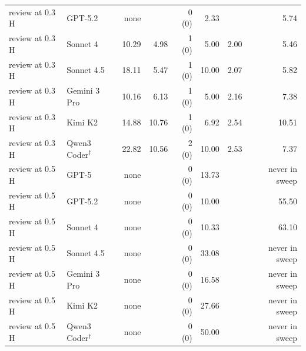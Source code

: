 \begin{table}[t]
\begin{tabular}{llrrrrrr}
review at 0.3 H & GPT-5.2 & none &  & 0 (0) & 2.33 &  & 5.74 \\
review at 0.3 H & Sonnet 4 & 10.29 & 4.98 & 1 (0) & 5.00 & 2.00 & 5.46 \\
review at 0.3 H & Sonnet 4.5 & 18.11 & 5.47 & 1 (0) & 10.00 & 2.07 & 5.82 \\
review at 0.3 H & Gemini 3 Pro & 10.16 & 6.13 & 1 (0) & 5.00 & 2.16 & 7.38 \\
review at 0.3 H & Kimi K2 & 14.88 & 10.76 & 1 (0) & 6.92 & 2.54 & 10.51 \\
review at 0.3 H & Qwen3 Coder$^\dagger$ & 22.82 & 10.56 & 2 (0) & 10.00 & 2.53 & 7.37 \\
\midrule
review at 0.5 H & GPT-5 & none &  & 0 (0) & 13.73 &  & never in sweep \\
review at 0.5 H & GPT-5.2 & none &  & 0 (0) & 10.00 &  & 55.50 \\
review at 0.5 H & Sonnet 4 & none &  & 0 (0) & 10.33 &  & 63.10 \\
review at 0.5 H & Sonnet 4.5 & none &  & 0 (0) & 33.08 &  & never in sweep \\
review at 0.5 H & Gemini 3 Pro & none &  & 0 (0) & 16.58 &  & never in sweep \\
review at 0.5 H & Kimi K2 & none &  & 0 (0) & 27.66 &  & never in sweep \\
review at 0.5 H & Qwen3 Coder$^\dagger$ & none &  & 0 (0) & 50.00 &  & never in sweep \\
\bottomrule
\end{tabular}
\end{table}
